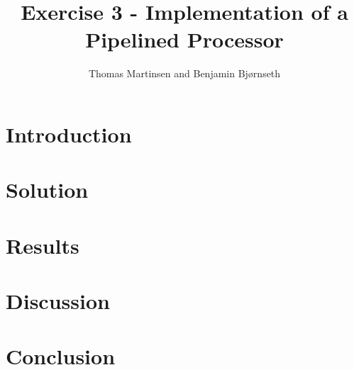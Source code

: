 \documentclass[11pt]{article}
\title{Exercise 3 - Implementation of a Pipelined Processor}
\author{Thomas Martinsen and Benjamin Bj\o rnseth}
\begin{document}
\maketitle

\begin{abstract}

\end{abstract}

\section{Introduction}
\label{sec:introduction}

\section{Solution}
\label{sec:solution}

\section{Results}
\label{sec:results}

\section{Discussion}
\label{sec:discussion}

\section{Conclusion}
\label{sec:conclusion}
\end{document}
